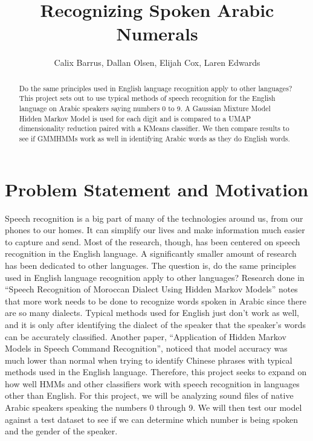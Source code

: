 \documentclass[11pt]{article}
\newcommand{\0}{{\vec  0 }}
\newcommand{\1}{{\mathbbm{  1} }}
\begin{document}
    
    \title{Recognizing Spoken Arabic Numerals}
    \author{Calix Barrus, Dallan Olsen, Elijah Cox, Laren Edwards}
    
    \maketitle
    
    \begin{abstract}
        Do the same principles used in English language recognition apply to other languages? This project sets out to use typical methods of speech recognition for the English language on Arabic speakers saying numbers 0 to 9. A Gaussian Mixture Model Hidden Markov Model is used for each digit and is compared to a UMAP dimensionality reduction paired with a KMeans classifier. We then compare results to see if GMMHMMs work as well in identifying Arabic words as they do English words.
    \end{abstract}
    
    \section{Problem Statement and Motivation}
    Speech recognition is a big part of many of the technologies around us, from our phones to our homes. It can simplify our lives and make information much easier to capture and send. Most of the research, though, has been centered on speech recognition in the English language. A significantly smaller amount of research has been dedicated to other languages. The question is, do the same principles used in English language recognition apply to other languages? Research done in “Speech Recognition of Moroccan Dialect Using Hidden Markov Models” notes that more work needs to be done to recognize words spoken in Arabic since there are so many dialects. Typical methods used for English just don’t work as well, and it is only after identifying the dialect of the speaker that the speaker’s words can be accurately classified. Another paper, “Application of Hidden Markov Models in Speech Command Recognition”, noticed that model accuracy was much lower than normal when trying to identify Chinese phrases with typical methods used in the English language. Therefore, this project seeks to expand on how well HMMs and other classifiers work with speech recognition in languages other than English. For this project, we will be analyzing sound files of native Arabic speakers speaking the numbers 0 through 9. We will then test our model against a test dataset to see if we can determine which number is being spoken and the gender of the speaker. 
    
\end{document}

